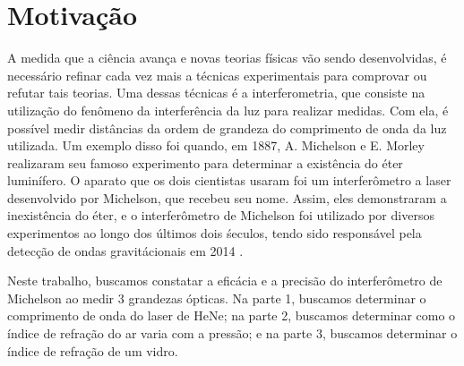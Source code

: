 \section{Motivação}

A medida que a ciência avança e novas teorias físicas vão sendo desenvolvidas, é necessário refinar cada vez mais a técnicas experimentais para comprovar ou refutar tais teorias.
Uma dessas técnicas é a interferometria, que consiste na utilização do fenômeno da interferência da luz para realizar medidas.
Com ela, é possível medir distâncias da ordem de grandeza do comprimento de onda da luz utilizada. 
Um exemplo disso foi quando, em 1887, A. Michelson e E. Morley realizaram seu famoso experimento para determinar a existência do éter luminífero.
O aparato que os dois cientistas usaram foi um interferômetro a laser desenvolvido por Michelson, que recebeu seu nome. 
Assim, eles demonstraram a inexistência do éter, e o interferômetro de Michelson foi utilizado por diversos experimentos ao longo dos últimos dois śeculos, tendo sido responsável pela detecção de ondas gravitácionais em 2014 .

Neste trabalho, buscamos constatar a eficácia e a precisão do interferômetro de Michelson ao medir 3 grandezas ópticas. 
Na parte 1, buscamos determinar o comprimento de onda do laser de HeNe; 
na parte 2, buscamos determinar como o índice de refração do ar varia com a pressão; 
e na parte 3, buscamos determinar o índice de refração de um vidro.
